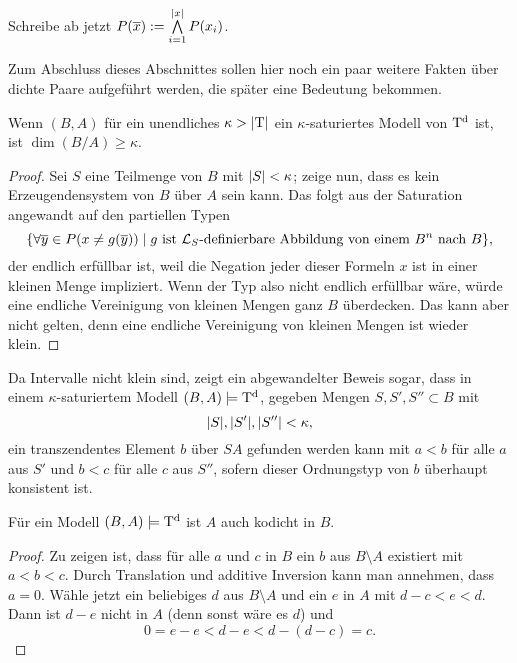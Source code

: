 \begin{definition}
	Schreibe ab jetzt $P(\overline{x}):=\bigwedge\limits_{i=1}^{\left| x \right|}P(x_i)$.
\end{definition}

Zum Abschluss dieses Abschnittes sollen hier noch ein paar weitere Fakten über dichte Paare aufgeführt werden, die später eine Bedeutung bekommen.

\begin{lemma}
	Wenn $(B,A)$ für ein unendliches $\kappa>{\left| \operatorname{T} \right|}$ ein $\kappa$-saturiertes Modell von $\operatorname{T^d}$ ist, ist $\dim(B/A)\geq\kappa$.
\end{lemma}
\begin{proof}
	Sei $S$ eine Teilmenge von $B$ mit ${\left| S \right|}<\kappa$; zeige nun, dass es kein Erzeugendensystem von $B$ über $A$ sein kann. Das folgt aus der Saturation angewandt auf den partiellen Typen $$\{\forall\overline{y}\in P(x\neq g(\overline{y}))\mid g\text{ ist }\mathcal{L}_S\text{-definierbare Abbildung von einem }B^n\text{ nach }B\},$$ der endlich erfüllbar ist, weil die Negation jeder dieser Formeln \glqq{}$x$ ist in einer kleinen Menge\grqq{} impliziert. Wenn der Typ also nicht endlich erfüllbar wäre, würde eine endliche Vereinigung von kleinen Mengen ganz $B$ überdecken. Das kann aber nicht gelten, denn eine endliche Vereinigung von kleinen Mengen ist wieder klein.
\end{proof}

\begin{corollary}\label{Finden transz Elte}
	Da Intervalle nicht klein sind, zeigt ein abgewandelter Beweis sogar, dass in einem $\kappa$-saturiertem Modell $(B,A)\models\operatorname{T^d}$, gegeben Mengen $S,S',S''\subset B$ mit $${\left| S \right|},{\left| S' \right|},{\left| S'' \right|}<\kappa,$$ ein transzendentes Element $b$ über $SA$ gefunden werden kann mit $a<b$ für alle $a$ aus $S'$ und $b<c$ für alle $c$ aus $S''$, sofern dieser Ordnungstyp von $b$ überhaupt konsistent ist.
\end{corollary}

\begin{lemma}\label{Kodichte von A}
	Für ein Modell $(B,A)\models\operatorname{T^d}$ ist $A$ auch kodicht in $B$.
\end{lemma}
\begin{proof}
	Zu zeigen ist, dass für alle $a$ und $c$ in $B$ ein $b$ aus $B\setminus A$ existiert mit $a<b<c$. Durch Translation und additive Inversion kann man annehmen, dass $a=0$. Wähle jetzt ein beliebiges $d$ aus $B\setminus A$ und ein $e$ in $A$ mit $d-c<e<d$. Dann ist $d-e$ nicht in $A$ (denn sonst wäre es $d$) und $$0=e-e<d-e<d-(d-c)=c.$$
\end{proof}


